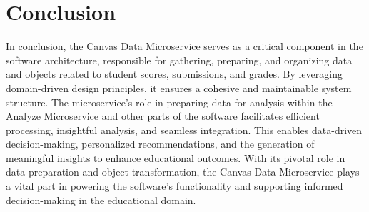 \documentclass[a4paper, 11pt]{article}
\begin{document}
\section{Conclusion}
In conclusion, the Canvas Data Microservice serves as a critical component in the software architecture, responsible for gathering, preparing, and organizing data and objects related to student scores, submissions, and grades. By leveraging domain-driven design principles, it ensures a cohesive and maintainable system structure. The microservice's role in preparing data for analysis within the Analyze Microservice and other parts of the software facilitates efficient processing, insightful analysis, and seamless integration. This enables data-driven decision-making, personalized recommendations, and the generation of meaningful insights to enhance educational outcomes. With its pivotal role in data preparation and object transformation, the Canvas Data Microservice plays a vital part in powering the software's functionality and supporting informed decision-making in the educational domain.




\pagebreak
\end{document}
